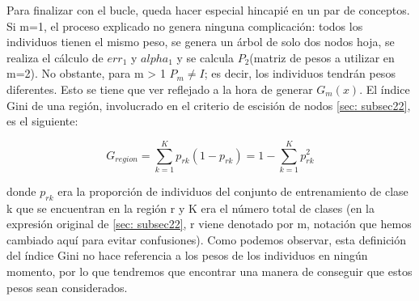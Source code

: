 \documentclass[12pt,twoside]{article}
\begin{document}
Para finalizar con el bucle, queda hacer especial hincapié en un par de conceptos. Si m=1, el proceso explicado no genera ninguna complicación: todos los individuos tienen el mismo peso, se genera un árbol de solo dos nodos hoja, se realiza el cálculo de $err_1$ y $alpha_1$ y se calcula $P_2$(matriz de pesos a utilizar en m=2). No obstante, para m > 1 $P_m \neq I$; es decir, los individuos tendrán pesos diferentes. Esto se tiene que ver reflejado a la hora de generar $G_m(x)$. El índice Gini de una región, involucrado en el criterio de escisión de nodos \ref{sec: subsec22}, es el siguiente:

\begin{equation*}
G_{region} = \sum_{k=1}^K p_{rk}(1 - p_{rk}) = 1 - \sum_{k=1}^K p_{rk}^2
\end{equation*}

\noindent
donde $p_{rk}$ era la proporción de individuos del conjunto de entrenamiento de clase k que se encuentran en la región r y K era el número total de clases (en la expresión original de \ref{sec: subsec22}, r viene denotado por m, notación que hemos cambiado aquí para evitar confusiones). Como podemos observar, esta definición del índice Gini no hace referencia a los pesos de los individuos en ningún momento, por lo que tendremos que encontrar una manera de conseguir que estos pesos sean considerados.
\end{document}
